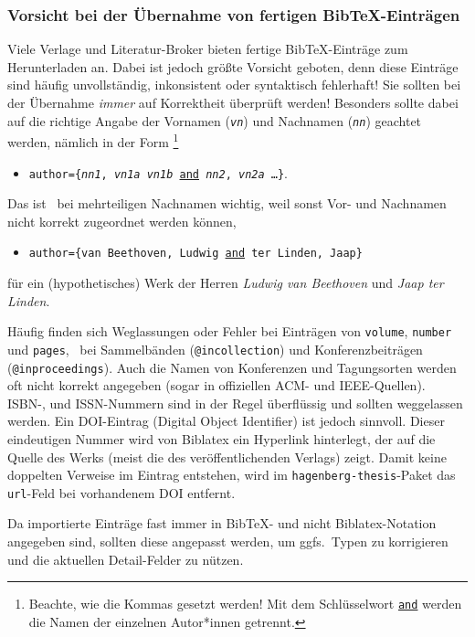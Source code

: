\subsubsection{Vorsicht bei der Übernahme von fertigen BibTeX-Einträgen}

Viele Verlage und Literatur-Broker bieten fertige BibTeX-Einträge zum
Herunterladen an. Dabei ist jedoch größte Vorsicht geboten, denn diese
Einträge sind häufig unvollständig, inkonsistent oder syntaktisch fehlerhaft!
Sie sollten bei der Übernahme \emph{immer} auf Korrektheit überprüft werden!
Besonders sollte dabei auf die richtige Angabe der Vornamen
(\texttt{\textit{vn}}) und Nachnamen (\texttt{\textit{nn}}) geachtet werden,
nämlich in der Form%
\footnote{Beachte, wie die Kommas gesetzt werden! Mit dem Schlüsselwort
\underline{\texttt{and}} werden die Namen der einzelnen Autor*innen getrennt.}
%
\begin{itemize}
\item[]
\texttt{author=\{\textit{nn1}, \textit{vn1a} \emph{vn1b} \underline{and}
\textit{nn2}, \textit{vn2a} \ldots \}}.
\end{itemize}
%
Das ist \va\ bei mehrteiligen Nachnamen wichtig, weil sonst Vor- und
Nachnamen nicht korrekt zugeordnet werden können, \zB
%
\begin{itemize}
\item[]
\texttt{author=\{van Beethoven, Ludwig \underline{and} ter Linden, Jaap\}}
\end{itemize}
%
für ein (hypothetisches) Werk der Herren \emph{Ludwig van Beethoven} und
\emph{Jaap ter Linden}.

Häufig finden sich Weglassungen oder Fehler bei Einträgen von
\texttt{volume}, \texttt{number} und \texttt{pages}, \va\ bei Sammelbänden
(\texttt{@incollection}) und Konferenzbeiträgen (\texttt{@inproceedings}).
Auch die Namen von Konferenzen und Tagungsorten werden oft nicht korrekt
angegeben (sogar in offiziellen ACM- und IEEE-Quellen). ISBN-, und
ISSN-Nummern sind in der Regel überflüssig und sollten weggelassen werden.
Ein DOI-Eintrag (Digital Object Identifier) ist jedoch sinnvoll. Dieser
eindeutigen Nummer wird von Biblatex ein Hyperlink hinterlegt, der auf die
Quelle des Werks (meist die des veröffentlichenden Verlags) zeigt. Damit
keine doppelten Verweise im Eintrag entstehen, wird im
\texttt{hagenberg-thesis}-Paket das \texttt{url}-Feld bei vorhandenem DOI
entfernt.

Da importierte Einträge fast immer in BibTeX- und nicht Biblatex-Notation
angegeben sind, sollten diese angepasst werden, um ggfs.\ Typen zu
korrigieren und die aktuellen Detail-Felder zu nützen.


